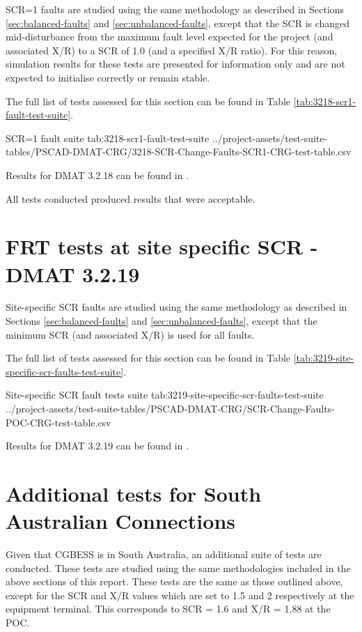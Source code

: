 \documentclass{../grid-link-report}
\newcommand{\projectassetsdir}{../project-assets}
\begin{document}
	SCR=1 faults are studied using the same methodology as described in Sections \ref{sec:balanced-faults} and \ref{sec:unbalanced-faults}, except that the SCR is changed mid-disturbance from the maximum fault level expected for the project (and associated X/R) to a SCR of 1.0 (and a specified X/R ratio). For this reason, simulation results for these tests are presented for information only and are not expected to initialise correctly or remain stable.
	
	The full list of tests assessed for this section can be found in Table \ref{tab:3218-scr1-fault-test-suite}.
	
	{
		\fontsize{5}{7}\selectfont
		\autoscaledlongtable
		{SCR=1 fault suite}
		{tab:3218-scr1-fault-test-suite}
		{\projectassetsdir/test-suite-tables/PSCAD-DMAT-CRG/3218-SCR-Change-Faults-SCR1-CRG-test-table.csv}
	}
	
	Results for DMAT 3.2.18 can be found in .
	
	All tests conducted produced results that were acceptable.
	
	
	\section{FRT tests at site specific SCR - DMAT 3.2.19}		
	
	
	Site-specific SCR faults are studied using the same methodology as described in Sections \ref{sec:balanced-faults} and \ref{sec:unbalanced-faults}, except that the minimum SCR (and associated X/R) is used for all faults.
	
	The full list of tests assessed for this section can be found in Table \ref{tab:3219-site-specific-scr-faults-test-suite}.
	
	{
		\fontsize{4}{6}\selectfont
		\autoscaledlongtable
		{Site-specific SCR fault tests suite}
		{tab:3219-site-specific-scr-faults-test-suite}
		{\projectassetsdir/test-suite-tables/PSCAD-DMAT-CRG/SCR-Change-Faults-POC-CRG-test-table.csv}
	}
	
	Results for DMAT 3.2.19 can be found in .
	
		\section{Additional tests for South Australian Connections}
	
	Given that \ac{CGBESS} is in South Australia, an additional suite of tests are conducted. These tests are studied using the same methodologies included in the above sections of this report. These tests are the same as those outlined above, except for the \ac{SCR} and X/R values which are set to 1.5 and 2 respectively at the equipment terminal. This corresponds to SCR = 1.6 and X/R = 1.88 at the POC. 
	
\end{document}
